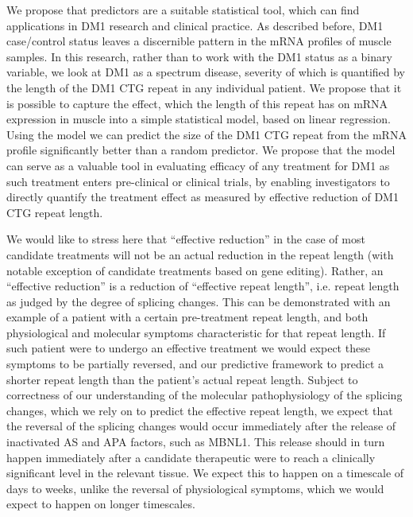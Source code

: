 \documentclass[10pt,letterpaper]{article}
\begin{document}
We propose that predictors are a suitable statistical tool, which can find applications in DM1 research and clinical practice. As described before, DM1 case/control status \cite{Nakamori2013, Batra2014} leaves a discernible pattern in the mRNA profiles of muscle samples. In this research, rather than to work with the DM1 status as a binary variable, we look at DM1 as a spectrum disease, severity of which is quantified by the length of the DM1 CTG repeat in any individual patient. We propose that it is possible to capture the effect, which the length of this repeat has on mRNA expression in muscle into a simple statistical model, based on linear regression. Using the model we can predict the size of the DM1 CTG repeat from the mRNA profile significantly better than a random predictor. We propose that the model can serve as a valuable tool in evaluating efficacy of any treatment for DM1 as such treatment enters pre-clinical or clinical trials, by enabling investigators to directly quantify the treatment effect as measured by effective reduction of DM1 CTG repeat length.

We would like to stress here that ``effective reduction'' in the case of most candidate treatments will not be an actual reduction in the repeat length (with notable exception of candidate treatments based on gene editing). Rather, an ``effective reduction'' is a reduction of ``effective repeat length'', i.e. repeat length as judged by the degree of splicing changes. This can be demonstrated with an example of a patient with a certain pre-treatment repeat length, and both physiological and molecular symptoms characteristic for that repeat length. If such patient were to undergo an effective treatment we would expect these symptoms to be partially reversed, and our predictive framework to predict a shorter repeat length than the patient's actual repeat length. Subject to correctness of our understanding of the molecular pathophysiology of the splicing changes, which we rely on to predict the effective repeat length, we expect that the reversal of the splicing changes would occur immediately after the release of inactivated AS and APA factors, such as MBNL1. This release should in turn happen immediately after a candidate therapeutic were to reach a clinically significant level in the relevant tissue. We expect this to happen on a timescale of days to weeks, unlike the reversal of physiological symptoms, which we would expect to happen on longer timescales.
\end{document}
